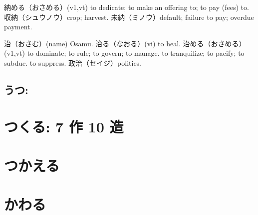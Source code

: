 納める（おさめる）(v1,vt)
to dedicate; to make an offering to; to pay (fees) to.
収納（シュウノウ）crop; harvest.
未納（ミノウ）default; failure to pay; overdue payment.

治（おさむ）(name) Osamu.
治る（なおる）(vi) to heal.
治める（おさめる）(v1,vt)
to dominate; to rule; to govern; to manage.
to tranquilize; to pacify; to subdue.
to suppress.
政治（セイジ）politics.

\subsection{うつ:}

\section{つくる: 7 作 10 造}

\section{つかえる}

\section{かわる}
